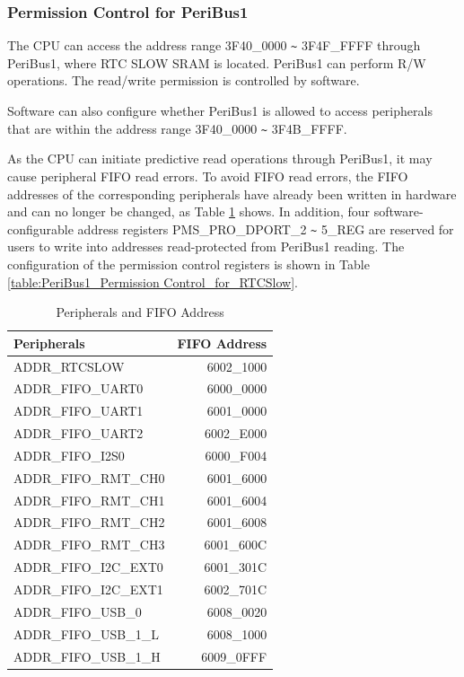 \documentclass[main\_\_EN.tex]{subfiles}
\begin{document}
\subsubsection{Permission Control for PeriBus1}
The CPU can access the address range \hexprefix{}3F40\_0000 \verb+~+ \hexprefix{}3F4F\_FFFF through PeriBus1, where RTC SLOW SRAM is located. PeriBus1 can perform R/W operations. The read/write permission is controlled by software.

Software can also configure whether PeriBus1 is allowed to access peripherals that are within the address range \hexprefix{}3F40\_0000 \verb+~+ \hexprefix{}3F4B\_FFFF.

As the CPU can initiate predictive read operations through PeriBus1, it may cause peripheral FIFO read errors. To avoid FIFO read errors, the FIFO addresses of the corresponding peripherals have already been written in hardware and can no longer be changed, as Table \ref{FIFO Address and Corresponding Peripherals} shows. In addition, four software-configurable address registers PMS\_PRO\_DPORT\_2 \verb+~+ 5\_REG are reserved for users to write into addresses read-protected from PeriBus1 reading. The configuration of the permission control registers is shown in Table \ref{table:PeriBus1_Permission Control_for_RTCSlow}.

\begin{longtable}[c]{|m{5cm}|r|}
\caption{Peripherals and FIFO Address}\label{FIFO Address and Corresponding Peripherals}
\\\hline
\rowcolor{lightgray}
Peripherals & FIFO Address \\\hline
ADDR\_RTCSLOW & \hexprefix{}6002\_1000\\\hline
ADDR\_FIFO\_UART0 & \hexprefix{}6000\_0000\\\hline
ADDR\_FIFO\_UART1 & \hexprefix{}6001\_0000\\\hline
ADDR\_FIFO\_UART2 & \hexprefix{}6002\_E000\\\hline
ADDR\_FIFO\_I2S0 & \hexprefix{}6000\_F004\\\hline
ADDR\_FIFO\_RMT\_CH0 & \hexprefix{}6001\_6000\\\hline
ADDR\_FIFO\_RMT\_CH1 & \hexprefix{}6001\_6004\\\hline
ADDR\_FIFO\_RMT\_CH2 & \hexprefix{}6001\_6008\\\hline
ADDR\_FIFO\_RMT\_CH3 & \hexprefix{}6001\_600C\\\hline
ADDR\_FIFO\_I2C\_EXT0 & \hexprefix{}6001\_301C\\\hline
ADDR\_FIFO\_I2C\_EXT1 & \hexprefix{}6002\_701C\\\hline
ADDR\_FIFO\_USB\_0 & \hexprefix{}6008\_0020\\\hline
ADDR\_FIFO\_USB\_1\_L & \hexprefix{}6008\_1000\\\hline
ADDR\_FIFO\_USB\_1\_H & \hexprefix{}6009\_0FFF\\\hline

\end{longtable}
\end{document}
